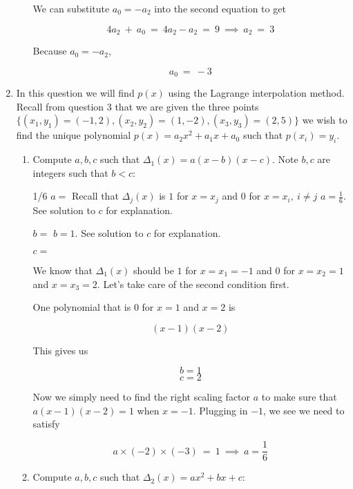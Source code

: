 \documentclass[11pt, preview]{standalone} %
\begin{document}
\begin{enumerate}
\begin{enumerate}
\begin{Freeform}{-3}
We can substitute $a_0 = -a_2$ into the second equation to get 

$$4a_2\ +\ a_0\ =\ 4a_2 - a_2\ =\ 9\ \implies\ a_2\ =\ 3$$

Because $a_0 = -a_2$,

$$a_0\ =\ -3$$
\end{Freeform}

\end{enumerate}

\item In this question we will find $p(x)$ using the Lagrange interpolation method. Recall from question 3 that we are given the three points $\{(x_1,y_1) = (-1,2), (x_2,y_2) = (1,-2),(x_3,y_3) = (2,5)\}$ we wish to find the unique polynomial $p(x) = a_2 x^2 + a_1 x + a_0$ such that $p(x_i) = y_i$. 
\begin{enumerate}
\item Compute $a,b,c$ such that $\Delta_1(x) = a(x-b)(x-c)$. Note $b,c$ are integers such that $b<c$:

 \begin{Freeform}{1/6}
 $a = $
 \Hint Recall that $\Delta_j(x)$ is $1$ for $x = x_j$ and $0$ for $x = x_i,\ i \not= j$
 \Solution $a = \frac{1}{6}$. See solution to $c$ for explanation.
 \end{Freeform}
 \begin{Freeform}{1}
 $b = $
 \Solution $b = 1$. See solution to $c$ for explanation.
 \end{Freeform}
 \begin{Freeform}{2}
 $c = $

 \Solution We know that $\Delta_1(x)$ should be $1$ for $x = x_1 = -1$ and $0$ for $x = x_2 = 1$ and $x = x_3 = 2$. Let's take care of the second condition first.

 One polynomial that is $0$ for $x = 1$ and $x = 2$ is 

 $$(x - 1)(x - 2)$$

 This gives us 

 $$b = 1$$
 $$c = 2$$ 

 Now we simply need to find the right scaling factor $a$ to make sure that $a(x - 1)(x - 2) = 1$ when $x = -1$. Plugging in $-1$, we see we need to satisfy

 $$a \times (-2) \times (-3)\ =\ 1\ \implies\ a = \frac{1}{6}$$
 \end{Freeform}
  
\item Compute $a,b,c$ such that $\Delta_2(x) = a x^2 + b x + c$:
 

\end{enumerate}
\end{enumerate}
\end{document}
